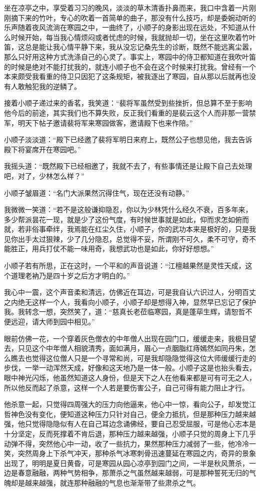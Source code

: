 坐在凉亭之中，享受着习习的晚风，淡淡的草木清香扑鼻而来，我口中含着一片刚刚摘下来的竹叶，专心的吹着一首简单的曲子，那没有什么技巧，却是委婉动听的乐声随着夜风流淌在寒园之中，一曲终了，小顺子的身影出现在远处，不知道从什么时候开始，每当我心情烦闷或者忧虑的时候，我就抛却一切，坐在这里吹着竹叶笛，这总是能让我心情平静下来，我从没忘记桑先生的诊断，既然不能远离尘嚣，那么只好用这种方式洗涤自己的心灵了。事实上，寒园中的侍卫都知道在我吹叶笛的时候是绝对不能打扰我的，就连小顺子也不会在这个时候来打扰我。曾经有一个本来颇受我看重的侍卫只因犯了这条规矩，被我逐出了寒园，自从那以后就再也没有人敢触犯我的逆鳞了。

接着小顺子递过来的香茗，我笑道：“裴将军虽然受到些挫折，但总算不至于影响他今后的前途，其实我们也不算失败，反正我们看重的是裴云这个人而非那一营禁军，明天下帖子邀请裴将军来寒园做客，邀请殿下也来作陪。”

小顺子淡淡道：“殿下已经邀了裴将军明日来府上，既然公子也想见他，我去告诉殿下将宴席开在寒园吧。”

我摇头道：“既然殿下已经相邀了，我就不去了，有些事情还是让殿下自己去处理吧，对了，少林怎么样？”

小顺子皱眉道：“名门大派果然沉得住气，现在还没有动静。”

我微微一笑道：“若不是这般谦抑隐忍，你以为少林凭什么经久不衰，百多年来，多少帮派昙花一现，就是少了这份气度，有时候世事就是如此，仰而求怎如俯而就，若非俗事牵绊，我焉能在红尘久住，小顺子，你的武功本来是极好的，只是我见你出手太过狠辣，少了几分隐忍，总觉得不妥，所谓刚不可久，柔不可守，奇不能胜正，用兵打仗不能一味用奇，我想武功也是如此，你好好想想。”

小顺子若有所思，正在这时，一个平和的声音说道：“江檀越果然是灵性天成，这个道理老衲乃是四十岁之后方才明白的。”

我心中一震，这个声音柔和清远，仿佛近在耳边，可是我自认六识过人，分明百丈之内绝无这样一个人，我看向小顺子，小顺子却是想得入神，显然早已忘记了保护我。我转念一想，突然笑了，道：“慈真长老莅临寒园，真是蓬荜生辉，请恕哲不便远迎，请大师到园中相见。”

眼前仿佛一花，一个穿着灰色僧衣的中年僧人出现在园门口，缓缓走来，我极目望去，只见这个中年僧人相貌清秀，面如满月，眉心一点胭脂红痔嫣然如同丹朱，怎么瞧去也觉得这位僧人只是一个寻常和尚，可是我却隐隐觉得这位大师缓缓行走的步伐，一举一动浑然天成，好像和这天地乃是一体一般。小顺子这是也抬头看去，眼中神光闪烁，他虽然知道这人身份，但是天下之人在他看来都是可有可无之人，所以他反而起了杀意，这样一个人若是要伤害公子，自己可得有能力阻止才行。

他杀意一起，只觉得四周强大的压力向他逼来，他心中一惊，看向公子，却发觉江哲神色没有变化，便知道这种压力只针对自己，便全力抵抗，但是那种压力越来越强，他只觉得隐隐似有人在自己耳边念诵佛经，要自己忍受屈服，可是他心志本是十分坚定，反而死撑着不肯后退，那种压力越来越强，小顺子只觉的周身上下几乎动弹不得，突然他心中一动，收了一些抗力，果然那种压力减弱了一些，他冷冷一笑，突然周身上下杀气冲天，那种杀气冰寒刺骨迅速蔓延在寒园之内，奇异的景象出现了，明明是夏日黄昏，可是寒园从园心凉亭到园门之间，一半是秋风萧杀，一边是春意融融，两种气势相争，那萧杀之气虽然越来越弱，可是那种誓死无归的气魄却是越来越强，就连那种融融的气息也渐渐带了些肃杀之气。

